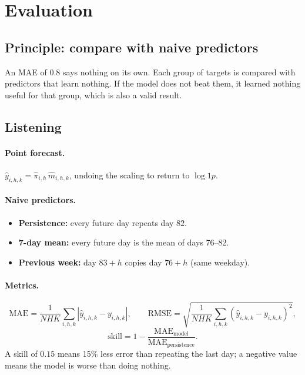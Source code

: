 \documentclass[11pt]{article}
\begin{document}
\section{Evaluation}

\subsection{Principle: compare with naive predictors}

An MAE of $0.8$ says nothing on its own. Each group of targets is compared with predictors that learn nothing. If the model does not beat them, it learned nothing useful for that group, which is also a valid result.

\subsection{Listening}

\paragraph{Point forecast.} $\hat y_{i,h,k} = \hat\pi_{i,h}\, \hat m_{i,h,k}$, undoing the scaling to return to $\log 1p$.

\paragraph{Naive predictors.}
\begin{itemize}
  \item \textbf{Persistence:} every future day repeats day 82.
  \item \textbf{7-day mean:} every future day is the mean of days 76--82.
  \item \textbf{Previous week:} day $83 + h$ copies day $76 + h$ (same weekday).
\end{itemize}

\paragraph{Metrics.}
\begin{equation}
\text{MAE} = \frac{1}{N H K}\sum_{i,h,k} |\hat y_{i,h,k} - y_{i,h,k}|, \qquad
\text{RMSE} = \sqrt{\frac{1}{N H K}\sum_{i,h,k} (\hat y_{i,h,k} - y_{i,h,k})^2},
\end{equation}
\begin{equation}
\text{skill} = 1 - \frac{\text{MAE}_{\text{model}}}{\text{MAE}_{\text{persistence}}} .
\end{equation}
A skill of $0.15$ means 15\% less error than repeating the last day; a negative value means the model is worse than doing nothing.
\end{document}
